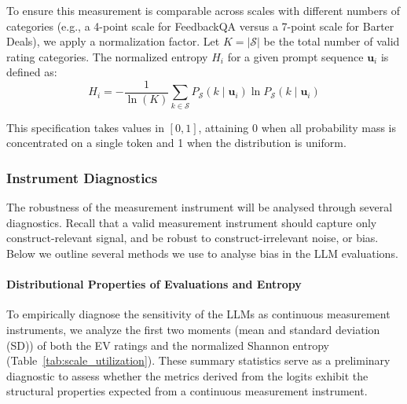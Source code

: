 To ensure this measurement is comparable across scales with different numbers of categories (e.g., a 4-point scale for FeedbackQA versus a 7-point scale for Barter Deals), we apply a normalization factor. Let $K = |\mathcal{S}|$ be the total number of valid rating categories. The normalized entropy $H_i$ for a given prompt sequence $\mathbf{u}_i$ is defined as:
\begin{equation}\label{eq:normalized_entropy}
    H_i = - \frac{1}{\ln(K)} \sum_{k \in \mathcal{S}} P_{\mathcal{S}}(k \mid \mathbf{u}_i) \ln P_{\mathcal{S}}(k \mid \mathbf{u}_i)
\end{equation}

This specification takes values in $[0,1]$, attaining 0 when all probability mass is concentrated on a single token and 1 when the distribution is uniform.

\subsubsection{Instrument Diagnostics}\label{sec:methods_instrument_diag}

The robustness of the measurement instrument will be analysed through several diagnostics. Recall that a valid measurement instrument should capture only construct-relevant signal, and be robust to construct-irrelevant noise, or bias. Below we outline several methods we use to analyse bias in the LLM evaluations. 

\paragraph{Distributional Properties of Evaluations and Entropy}

To empirically diagnose the sensitivity of the LLMs as continuous measurement instruments, we analyze the first two moments (mean and standard deviation (SD)) of both the EV ratings and the normalized Shannon entropy (Table~\ref{tab:scale_utilization}). These summary statistics serve as a preliminary diagnostic to assess whether the metrics derived from the logits exhibit the structural properties expected from a continuous measurement instrument. 





